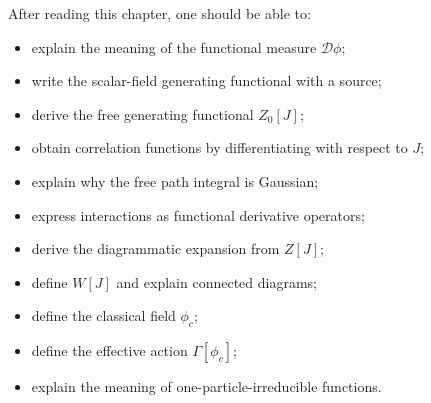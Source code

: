After reading this chapter, one should be able to:
\begin{itemize}
    \item explain the meaning of the functional measure \(\mathcal{D}\phi\);
    \item write the scalar-field generating functional with a source;
    \item derive the free generating functional \(Z_0[J]\);
    \item obtain correlation functions by differentiating with respect to \(J\);
    \item explain why the free path integral is Gaussian;
    \item express interactions as functional derivative operators;
    \item derive the diagrammatic expansion from \(Z[J]\);
    \item define \(W[J]\) and explain connected diagrams;
    \item define the classical field \(\phi_c\);
    \item define the effective action \(\Gamma[\phi_c]\);
    \item explain the meaning of one-particle-irreducible functions.
\end{itemize}
